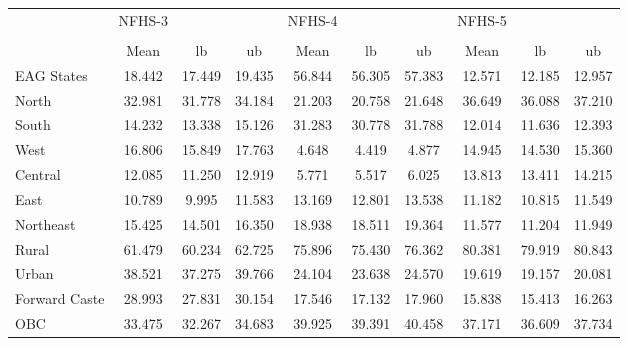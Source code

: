 {
\def\sym#1{\ifmmode^{#1}\else\(^{#1}\)\fi}
\begin{tabular}{l*{3}{ccc}}
\hline\hline
                    &      NFHS-3&            &            &      NFHS-4&            &            &      NFHS-5&            &            \\
                    &\multicolumn{3}{c}{}                  &\multicolumn{3}{c}{}                  &\multicolumn{3}{c}{}                  \\
                    &        Mean&          lb&          ub&        Mean&          lb&          ub&        Mean&          lb&          ub\\
\hline
EAG States          &      18.442&      17.449&      19.435&      56.844&      56.305&      57.383&      12.571&      12.185&      12.957\\
North               &      32.981&      31.778&      34.184&      21.203&      20.758&      21.648&      36.649&      36.088&      37.210\\
South               &      14.232&      13.338&      15.126&      31.283&      30.778&      31.788&      12.014&      11.636&      12.393\\
West                &      16.806&      15.849&      17.763&       4.648&       4.419&       4.877&      14.945&      14.530&      15.360\\
Central             &      12.085&      11.250&      12.919&       5.771&       5.517&       6.025&      13.813&      13.411&      14.215\\
East                &      10.789&       9.995&      11.583&      13.169&      12.801&      13.538&      11.182&      10.815&      11.549\\
Northeast           &      15.425&      14.501&      16.350&      18.938&      18.511&      19.364&      11.577&      11.204&      11.949\\
Rural               &      61.479&      60.234&      62.725&      75.896&      75.430&      76.362&      80.381&      79.919&      80.843\\
Urban               &      38.521&      37.275&      39.766&      24.104&      23.638&      24.570&      19.619&      19.157&      20.081\\
Forward Caste       &      28.993&      27.831&      30.154&      17.546&      17.132&      17.960&      15.838&      15.413&      16.263\\
OBC                 &      33.475&      32.267&      34.683&      39.925&      39.391&      40.458&      37.171&      36.609&      37.734\\

\end{tabular}}
